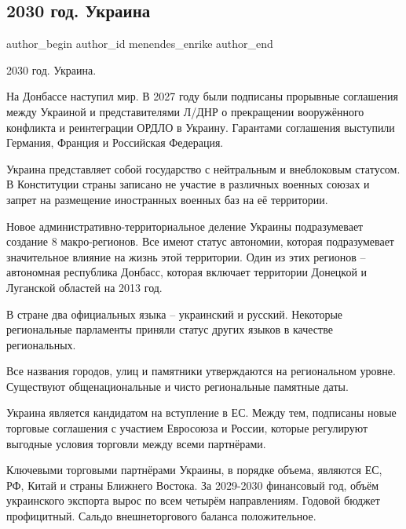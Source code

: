  
 
 
 
 
 
\subsection{2030 год. Украина}
\label{sec:11_01_2022.fb.menendes_enrike.1.ukraina_2030}
 
\ifcmt
 author_begin
   author_id menendes_enrike
 author_end
\fi

2030 год. Украина.

На Донбассе наступил мир. В 2027 году были подписаны прорывные соглашения между
Украиной и представителями Л/ДНР о прекращении вооружённого конфликта и
реинтеграции ОРДЛО в Украину. Гарантами соглашения выступили Германия, Франция
и Российская Федерация.

Украина представляет собой государство с нейтральным и внеблоковым статусом. В
Конституции страны записано не участие в различных военных союзах и запрет на
размещение иностранных военных баз на её территории.

Новое административно-территориальное деление Украины подразумевает создание 8
макро-регионов. Все имеют статус автономии, которая подразумевает значительное
влияние на жизнь этой территории. Один из этих регионов – автономная республика
Донбасс, которая включает территории Донецкой и Луганской областей на 2013 год.

В стране два официальных языка – украинский и русский. Некоторые региональные
парламенты приняли статус других языков в качестве региональных.

Все названия городов, улиц и памятники утверждаются на региональном уровне.
Существуют общенациональные и чисто региональные памятные даты.

Украина является кандидатом на вступление в ЕС. Между тем, подписаны новые
торговые соглашения с участием Евросоюза и России, которые регулируют выгодные
условия торговли между всеми партнёрами.

Ключевыми торговыми партнёрами Украины, в порядке объема, являются ЕС, РФ,
Китай и страны Ближнего Востока. За 2029-2030 финансовый год, объём украинского
экспорта вырос по всем четырём направлениям. Годовой бюджет профицитный. Сальдо
внешнеторгового баланса положительное.

